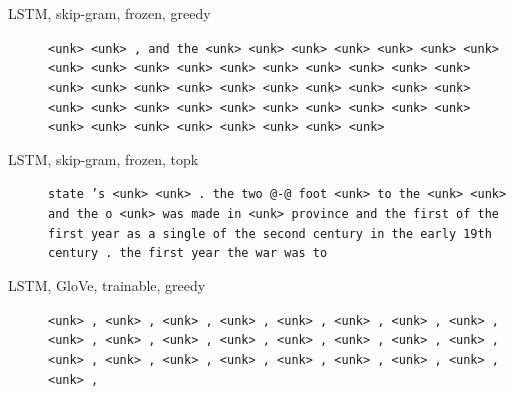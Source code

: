 \begin{description}
\item[LSTM, skip-gram, frozen, greedy] \texttt{\small \textless{}unk\textgreater{} \textless{}unk\textgreater{} , and the \textless{}unk\textgreater{} \textless{}unk\textgreater{} \textless{}unk\textgreater{} \textless{}unk\textgreater{} \textless{}unk\textgreater{} \textless{}unk\textgreater{} \textless{}unk\textgreater{} \textless{}unk\textgreater{} \textless{}unk\textgreater{} \textless{}unk\textgreater{} \textless{}unk\textgreater{} \textless{}unk\textgreater{} \textless{}unk\textgreater{} \textless{}unk\textgreater{} \textless{}unk\textgreater{} \textless{}unk\textgreater{} \textless{}unk\textgreater{} \textless{}unk\textgreater{} \textless{}unk\textgreater{} \textless{}unk\textgreater{} \textless{}unk\textgreater{} \textless{}unk\textgreater{} \textless{}unk\textgreater{} \textless{}unk\textgreater{} \textless{}unk\textgreater{} \textless{}unk\textgreater{} \textless{}unk\textgreater{} \textless{}unk\textgreater{} \textless{}unk\textgreater{} \textless{}unk\textgreater{} \textless{}unk\textgreater{} \textless{}unk\textgreater{} \textless{}unk\textgreater{} \textless{}unk\textgreater{} \textless{}unk\textgreater{} \textless{}unk\textgreater{} \textless{}unk\textgreater{} \textless{}unk\textgreater{} \textless{}unk\textgreater{} \textless{}unk\textgreater{} \textless{}unk\textgreater{} \textless{}unk\textgreater{} \textless{}unk\textgreater{} \textless{}unk\textgreater{} \textless{}unk\textgreater{}}
\item[LSTM, skip-gram, frozen, topk] \texttt{\small state 's \textless{}unk\textgreater{} \textless{}unk\textgreater{} . the two @-@ foot \textless{}unk\textgreater{} to the \textless{}unk\textgreater{} \textless{}unk\textgreater{} and the o \textless{}unk\textgreater{} was made in \textless{}unk\textgreater{} province and the first of the first year as a single of the second century in the early 19th century . the first year the war was to}
\item[LSTM, GloVe, trainable, greedy] \texttt{\small \textless{}unk\textgreater{} , \textless{}unk\textgreater{} , \textless{}unk\textgreater{} , \textless{}unk\textgreater{} , \textless{}unk\textgreater{} , \textless{}unk\textgreater{} , \textless{}unk\textgreater{} , \textless{}unk\textgreater{} , \textless{}unk\textgreater{} , \textless{}unk\textgreater{} , \textless{}unk\textgreater{} , \textless{}unk\textgreater{} , \textless{}unk\textgreater{} , \textless{}unk\textgreater{} , \textless{}unk\textgreater{} , \textless{}unk\textgreater{} , \textless{}unk\textgreater{} , \textless{}unk\textgreater{} , \textless{}unk\textgreater{} , \textless{}unk\textgreater{} , \textless{}unk\textgreater{} , \textless{}unk\textgreater{} , \textless{}unk\textgreater{} , \textless{}unk\textgreater{} , \textless{}unk\textgreater{} ,}

\end{description}
